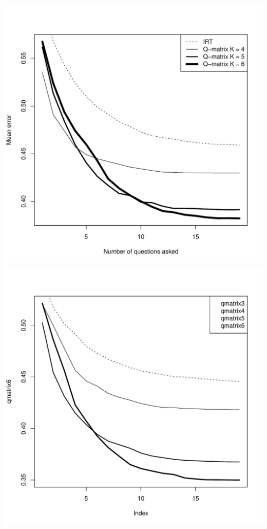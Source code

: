 \documentclass{sig-alternate}
\begin{document}
\includegraphics[width=\linewidth]{20-80.pdf}
\includegraphics[width=\linewidth]{20-160.pdf}
\end{document}
